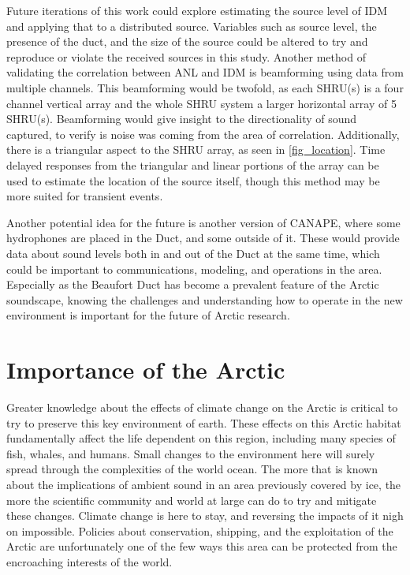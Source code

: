 Future iterations of this work could explore estimating the source level of IDM and applying that to a distributed source. Variables such as source level, the presence of the duct, and the size of the source could be altered to try and reproduce or violate the received sources in this study. Another method of validating the correlation between ANL and IDM is beamforming using data from multiple channels. This beamforming would be twofold, as each SHRU(s) is a four channel vertical array and the whole SHRU system a larger horizontal array of 5 SHRU(s). Beamforming would give insight to the directionality of sound captured, to verify is noise was coming from the area of correlation. Additionally, there is a triangular aspect to the SHRU array, as seen in \autoref{fig_location}. Time delayed responses from the triangular and linear portions of the array can be used to estimate the location of the source itself, though this method may be more suited for transient events.

Another potential idea for the future is another version of CANAPE, where some hydrophones are placed in the Duct, and some outside of it. These would provide data about sound levels both in and out of the Duct at the same time, which could be important to communications, modeling, and operations in the area. Especially as the Beaufort Duct has become a prevalent feature of the Arctic soundscape, knowing the challenges and understanding how to operate in the new environment is important for the future of Arctic research.


\section{Importance of the Arctic}

Greater knowledge about the effects of climate change on the Arctic is critical to try to preserve this key environment of earth. These effects on this Arctic habitat fundamentally affect the life dependent on this region, including many species of fish, whales, and humans. Small changes to the environment here will surely spread through the complexities of the world ocean. The more that is known about the implications of ambient sound in an area previously covered by ice, the more the scientific community and world at large can do to try and mitigate these changes. Climate change is here to stay, and reversing the impacts of it nigh on impossible. Policies about conservation, shipping, and the exploitation of the Arctic are unfortunately one of the few ways this area can be protected from the encroaching interests of the world.